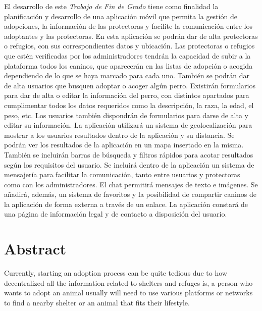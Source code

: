 \documentclass[a4paper, 12pt]{article}
\begin{document}
El desarrollo de este \textit{Trabajo de Fin de Grado} tiene como finalidad la planificación y desarrollo de una aplicación móvil que permita la gestión de adopciones, la información de las protectoras y facilite la comunicación entre los adoptantes y las protectoras. En esta aplicación se podrán dar de alta protectoras o refugios, con sus correspondientes datos y ubicación. Las protectoras o refugios que estén verificadas por los administradores tendrán la capacidad de subir a la plataforma todos los caninos, que aparecerán en las listas de adopción o acogida dependiendo de lo que se haya marcado para cada uno. También se podrán dar de alta usuarios que busquen adoptar o acoger algún perro. Existirán formularios para dar de alta o editar la información del perro, con distintos apartados para cumplimentar todos los datos requeridos como la descripción, la raza, la edad, el peso, etc. Los usuarios también dispondrán de formularios para darse de alta y editar su información. La aplicación utilizará un sistema de geolocalización para mostrar a los usuarios resultados dentro de la aplicación y su distancia. Se podrán ver los resultados de la aplicación en un mapa insertado en la misma. También se incluirán barras de búsqueda y filtros rápidos para acotar resultados según los requisitos del usuario. Se incluirá dentro de la aplicación un sistema de mensajería para facilitar la comunicación, tanto entre usuarios y protectoras como con los administradores. El chat permitirá mensajes de texto e imágenes. Se añadirá, además, un sistema de favoritos y la posibilidad de compartir caninos de la aplicación de forma externa a través de un enlace. La aplicación constará de una página de información legal y de contacto a disposición del usuario.


\newpage
\pagestyle{plain}
\thispagestyle{empty}
\mbox{}

\newpage
\pagestyle{plain}
\section*{Abstract}
Currently, starting an adoption process can be quite tedious due to how decentralized all the information related to shelters and refuges is, a person who wants to adopt an animal usually will need to use various platforms or networks to find a nearby shelter or an animal that fits their lifestyle.
\end{document}
